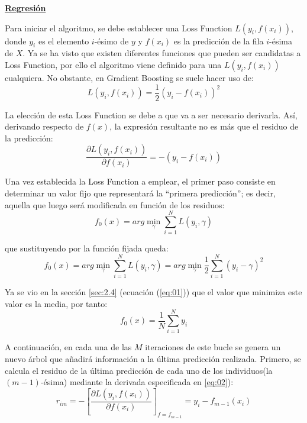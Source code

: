 \documentclass[12pt,twoside]{article}
\begin{document}
\bigskip \bigskip 

\textbf{\underline{Regresión}}


Para iniciar el algoritmo, se debe establecer una Loss Function $L(y_i, f(x_i))$, donde $y_i$ es el elemento $i$-ésimo de $y$ y $f(x_i)$ es la predicción de la fila $i$-ésima de $X$. Ya se ha visto que existen diferentes funciones que pueden ser candidatas a Loss Function, por ello el algoritmo viene definido para una $L(y_i, f(x_i))$ cualquiera. No obstante, en Gradient Boosting se suele hacer uso de:
\begin{equation*}
L(y_i, f(x_i)) = \frac{1}{2}(y_i - f(x_i))^2
\end{equation*}

La elección de esta Loss Function se debe a que va a ser necesario derivarla. Así, derivando respecto de $f(x)$, la expresión resultante no es más que el residuo de la predicción:
\begin{equation}
\label{eq:02}
\frac{\partial L(y_i, f(x_i))}{\partial f(x_i)} = -(y_i -f(x_i))
\end{equation}

Una vez establecida la Loss Function a emplear, el primer paso consiste en determinar un valor fijo que representará la ``primera predicción''; es decir, aquella que luego será modificada en función de los residuos:
\begin{equation*}
f_0(x) = arg\min_{\gamma} \sum_{i=1}^N L(y_i, \gamma)
\end{equation*}

\noindent
que sustituyendo por la función fijada queda:
\begin{equation*}
f_0(x) = arg\min_{\gamma} \sum_{i=1}^N L(y_i, \gamma) = arg\min_{\gamma} \frac{1}{2}\sum_{i=1}^N (y_i - \gamma)^2 
\end{equation*}

Ya se vio en la sección \ref{sec:2.4} (ecuación (\ref{eq:01})) que el valor que minimiza este valor es la media, por tanto:
\begin{equation*}
f_0(x) = \frac{1}{N} \sum_{i=1}^N y_i
\end{equation*}

A continuación, en cada una de las $M$ iteraciones de este bucle se genera un nuevo árbol que añadirá información a la última predicción realizada. Primero, se calcula el residuo de la última predicción de cada uno de los individuos(la $(m-1)$-ésima) mediante la derivada especificada en \ref{eq:02}):
\begin{equation*}
r_{im} = - \left[ \frac{\partial L(y_i, f(x_i))}{\partial f(x_i)} \right]_{f = f_{m-1}} = y_i -f_{m-1}(x_i)
\end{equation*}
\end{document}
